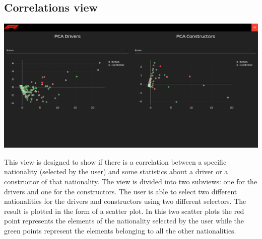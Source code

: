 \documentclass[10pt,twocolumn,letterpaper]{article}
\begin{document}
\subsection{Correlations view}
\begin{center}
	\centering
	\includegraphics[width=\columnwidth]{correlations}
\end{center}
This view is designed to show if there is a correlation between a specific nationality (selected by the user) and some statistics about a driver or a 
constructor of that nationality. The view is divided into two subviews: one for the drivers and one for the constructors. The user is able to select two different nationalities
for the drivers and constructors using two different selectors. The result is plotted in the form of a scatter plot. In this two scatter plots the red point represents the elements
of the nationality selected by the user while the green points represent the elements belonging to all the other nationalities.
\end{document}
